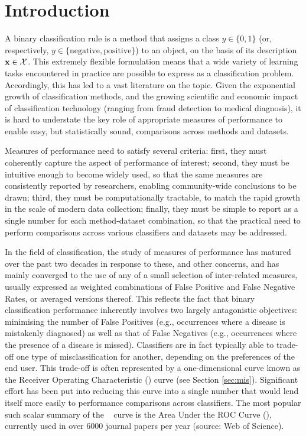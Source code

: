 \documentclass{article}
\def\AUC{\text{AUC}}
\def\ROC{\text{ROC}}
\begin{document}

\section{Introduction}
\label{sec:intro}
A binary classification rule is a method that assigns a class $y \in \{0,1\}$ (or, respectively, $y \in \{\text{negative},\text{positive}\}$) to an object, on the basis of its description $\bf{x} \in \mathcal{X}$. This extremely flexible formulation means that a wide variety of learning tasks encountered in practice are possible to express as a classification problem. Accordingly, this has led to a vast literature on the topic. Given the exponential growth of classification methods, and the growing scientific and economic impact of classification technology (ranging from fraud detection to medical diagnosis), it is hard to understate the key role of appropriate measures of performance to enable easy, but statistically sound, comparisons across methods and datasets. 

Measures of performance need to satisfy several criteria: first, they must coherently capture the aspect of performance of interest; second, they must be intuitive enough to become widely used, so that the same measures are consistently reported by researchers, enabling community-wide conclusions to be drawn; third, they must be computationally tractable, to match the rapid growth in the scale of modern data collection; finally, they must be simple to report as a single number for each method-dataset combination, so that the practical need to perform comparisons across various classifiers and datasets may be addressed. 

In the field of classification, the study of measures of performance has matured over the past two decades in response to these, and other concerns, and has mainly converged to the use of any of a small selection of inter-related measures, usually expressed as weighted combinations of False Positive and False Negative Rates, or averaged versions thereof. This reflects the fact that binary classification performance inherently involves two largely antagonistic objectives: minimising the number of False Positives (e.g., occurrences where a disease is mistakenly diagnosed) as well as that of False Negatives (e.g., occurrences where the presence of a disease is missed). Classifiers are in fact typically able to trade-off one type of misclassification for another, depending on the preferences of the end user. This trade-off is often represented by a one-dimensional curve known as the Receiver Operating Characteristic (\ROC) curve (see Section \ref{sec:mis}). Significant effort has been put into reducing this curve into a single number that would lend itself more easily to performance comparisons across classifiers. The most popular such scalar summary of the \ROC~ curve is the Area Under the ROC Curve (\AUC), currently used in over 6000 journal papers per year (source: Web of Science).
\end{document}
